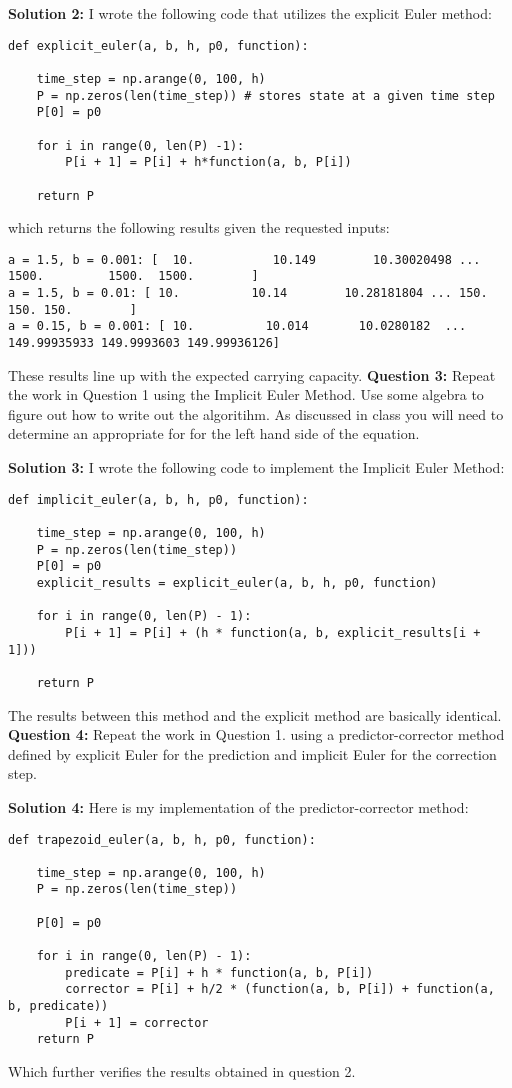\documentclass[10pt]{article}
\newcommand{\1}{\mathbb{1}}
\begin{document}
\textbf{Solution 2:} I wrote the following code that utilizes the explicit Euler method:
\begin{verbatim}
def explicit_euler(a, b, h, p0, function):

    time_step = np.arange(0, 100, h)
    P = np.zeros(len(time_step)) # stores state at a given time step
    P[0] = p0
    
    for i in range(0, len(P) -1):
        P[i + 1] = P[i] + h*function(a, b, P[i])

    return P
\end{verbatim}
which returns the following results given the requested inputs:
\begin{verbatim}
a = 1.5, b = 0.001: [  10.           10.149        10.30020498 ... 1500.         1500.  1500.        ]
a = 1.5, b = 0.01: [ 10.          10.14        10.28181804 ... 150.         150. 150.        ]
a = 0.15, b = 0.001: [ 10.          10.014       10.0280182  ... 149.99935933 149.9993603 149.99936126]
 \end{verbatim}
 These results line up with the expected carrying capacity.
\newpage
 \textbf{Question 3:} Repeat the work in Question 1 using the Implicit Euler Method. Use some algebra to figure out how to write out the algoritihm. As discussed in class you will need to determine an appropriate for for the left hand side of the equation.

 \textbf{Solution 3:} I wrote the following code to implement the Implicit Euler Method:
 \begin{verbatim}
def implicit_euler(a, b, h, p0, function):
    
    time_step = np.arange(0, 100, h)
    P = np.zeros(len(time_step))
    P[0] = p0
    explicit_results = explicit_euler(a, b, h, p0, function)
    
    for i in range(0, len(P) - 1):
        P[i + 1] = P[i] + (h * function(a, b, explicit_results[i + 1]))

    return P
 \end{verbatim}
 The results between this method and the explicit method are basically identical.\\

 \textbf{Question 4:} Repeat the work in Question 1. using a predictor-corrector method defined by explicit Euler for the prediction and implicit Euler for the correction step.

 \textbf{Solution 4:} Here is my implementation of the predictor-corrector method:
 \begin{verbatim}
def trapezoid_euler(a, b, h, p0, function):
    
    time_step = np.arange(0, 100, h)
    P = np.zeros(len(time_step))

    P[0] = p0

    for i in range(0, len(P) - 1):
        predicate = P[i] + h * function(a, b, P[i])
        corrector = P[i] + h/2 * (function(a, b, P[i]) + function(a, b, predicate))
        P[i + 1] = corrector
    return P
 \end{verbatim}

 Which further verifies the results obtained in question 2.\\
\noindent \underline{\hspace{3in}}\\
\end{document}
